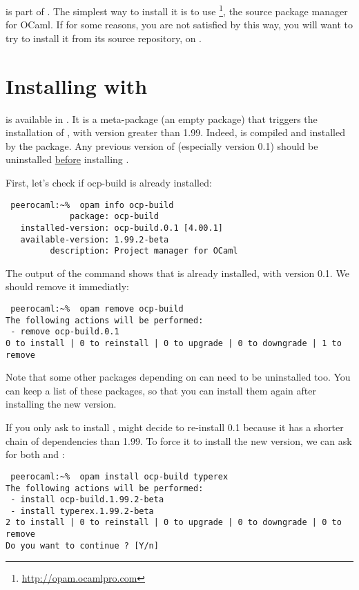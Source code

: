 
\ocpbuild{} is part of \typerex{}. The simplest way to install it is
to use \opam{}\footnote{\url{http://opam.ocamlpro.com}}, the source package
manager for OCaml. If for some reasons, you are not satisfied by this
way, you will want to try to install it from its source repository, on
\github{}.

\section{Installing with \opam{}}

\ocpbuild{} is available in \opam{}. It is a meta-package (an empty
package) that triggers the installation of \typerex{}, with version
greater than 1.99. Indeed, \ocpbuild{} is compiled and installed by
the \typerex{} package. Any previous version of \ocpbuild{}
(especially version 0.1) should be uninstalled \underline{before}
installing \typerex{}.

First, let's check if ocp-build is already installed:
\begin{verbatim}
 peerocaml:~%  opam info ocp-build
             package: ocp-build
   installed-version: ocp-build.0.1 [4.00.1]
   available-version: 1.99.2-beta
         description: Project manager for OCaml
\end{verbatim}

The output of the command shows that \ocpbuild{} is already installed,
with version 0.1. We should remove it immediatly:

\begin{verbatim}
 peerocaml:~%  opam remove ocp-build
The following actions will be performed:
 - remove ocp-build.0.1
0 to install | 0 to reinstall | 0 to upgrade | 0 to downgrade | 1 to remove
\end{verbatim}

Note that some other packages depending on \ocpbuild{} can need to be
uninstalled too. You can keep a list of these packages, so that you
can install them again after installing the new version.

If you only ask \opam{} to install \ocpbuild{}, \opam{} might decide
to re-install \ocpbuild{} 0.1 because it has a shorter chain of
dependencies than \ocpbuild{} 1.99. To force it to install the new
version, we can ask for both \ocpbuild{} and \typerex{}:
\begin{verbatim}
 peerocaml:~%  opam install ocp-build typerex
The following actions will be performed:
 - install ocp-build.1.99.2-beta
 - install typerex.1.99.2-beta
2 to install | 0 to reinstall | 0 to upgrade | 0 to downgrade | 0 to remove
Do you want to continue ? [Y/n]
\end{verbatim}

